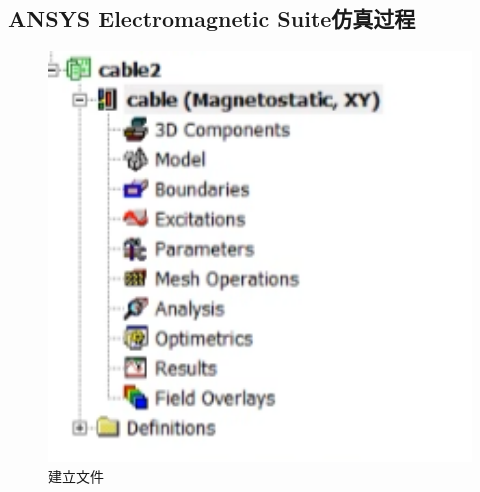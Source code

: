 \documentclass{article}
\begin{document}
\subsection{ANSYS Electromagnetic Suite仿真过程}
        \begin{figure}[H]
            \centering
            \includegraphics[width=12cm]{img/12.png}
          \caption[]{建立文件}  
          \end{figure}
\end{document}
